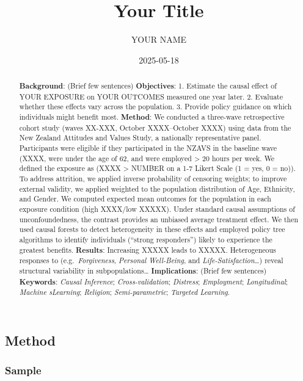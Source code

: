 \documentclass[
  single column]{article}
\title{Your Title}
\author{YOUR NAME}
\date{2025-05-18}
\begin{document}
\maketitle
\begin{abstract}
\textbf{Background}: (Brief few sentences) \textbf{Objectives}: 1.
Estimate the causal effect of YOUR EXPOSURE on YOUR OUTCOMES measured
one year later. 2. Evaluate whether these effects vary across the
population. 3. Provide policy guidance on which individuals might
benefit most. \textbf{Method}: We conducted a three-wave retrospective
cohort study (waves XX-XXX, October XXXX--October XXXX) using data from
the New Zealand Attitudes and Values Study, a nationally representative
panel. Participants were eligible if they participated in the NZAVS in
the baseline wave (XXXX, were under the age of 62, and were employed
\textgreater{} 20 hours per week. We defined the exposure as (XXXX
\textgreater{} NUMBER on a 1-7 Likert Scale (1 = yes, 0 = no)). To
address attrition, we applied inverse probability of censoring weights;
to improve external validity, we applied weighted to the population
distribution of Age, Ethnicity, and Gender. We computed expected mean
outcomes for the population in each exposure condition (high XXXX/low
XXXXX). Under standard causal assumptions of unconfoundedness, the
contrast provides an unbiased average treatment effect. We then used
causal forests to detect heterogeneity in these effects and employed
policy tree algorithms to identify individuals (``strong responders'')
likely to experience the greatest benefits. \textbf{Results}: Increasing
XXXXX leads to XXXXX. Heterogeneous responses to
(e.g.~\emph{Forgiveness}, \emph{Personal Well-Being}, and
\emph{Life-Satisfaction}\ldots) reveal structural variability in
subpopulations\ldots{} \textbf{Implications}: (Brief few sentences)
\textbf{Keywords}: \emph{Causal Inference}; \emph{Cross-validation};
\emph{Distress}; \emph{Employment}; \emph{Longitudinal}; \emph{Machine
sLearning}; \emph{Religion}; \emph{Semi-parametric}; \emph{Targeted
Learning}.
\end{abstract}


\newpage{}

\subsection{Method}\label{method}

\subsubsection{Sample}\label{sample}
\end{document}
